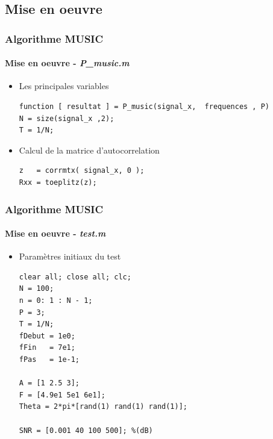 \documentclass[10pt]{beamer}
\begin{document}
    





    \subsection{Mise en oeuvre} 
    
    
    \begin{frame}[fragile]
        \frametitle{Algorithme MUSIC}
        \framesubtitle{Mise en oeuvre - \textit{P\_music.m}}
%       
%       
        \begin{itemize}
        \item  Les principales variables
        
        \begin{lstlisting}
function [ resultat ] = P_music(signal_x,  frequences , P)
N = size(signal_x ,2);
T = 1/N;
        \end{lstlisting}
%        
        \item  Calcul de la matrice d'autocorrelation  
        
        \begin{lstlisting}
z   = corrmtx( signal_x, 0 );
Rxx = toeplitz(z);
        \end{lstlisting} 

        \end{itemize}
\end{frame}


    
    \begin{frame}[fragile]
        \frametitle{Algorithme MUSIC}
        \framesubtitle{Mise en oeuvre - \textit{test.m}}
%       
%       
        \begin{itemize}

        \item Paramètres initiaux du test
        
        \begin{lstlisting}
clear all; close all; clc;
N = 100;
n = 0: 1 : N - 1;
P = 3;
T = 1/N;            
fDebut = 1e0;
fFin   = 7e1;       
fPas   = 1e-1; 

A = [1 2.5 3];
F = [4.9e1 5e1 6e1];
Theta = 2*pi*[rand(1) rand(1) rand(1)];

SNR = [0.001 40 100 500]; %(dB)

        \end{lstlisting} 
        
        \end{itemize}
\end{frame}
\end{document}
